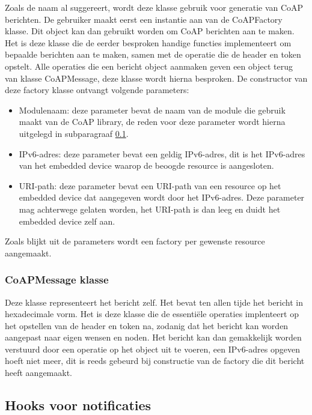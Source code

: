 Zoals de naam al suggereert, wordt deze klasse gebruik voor generatie van CoAP berichten. De gebruiker maakt eerst een instantie aan van de CoAPFactory klasse. Dit object kan dan gebruikt worden om CoAP berichten aan te maken. Het is deze klasse die de eerder besproken handige functies implementeert om bepaalde berichten aan te maken, samen met de operatie die de header en token opstelt. Alle operaties die een bericht object aanmaken geven een object terug van klasse CoAPMessage, deze klasse wordt hierna besproken. De constructor van deze factory klasse ontvangt volgende parameters:
\begin{itemize}
\item Modulenaam: deze parameter bevat de naam van de module die gebruik maakt van de CoAP library, de reden voor deze parameter wordt hierna uitgelegd in subparagraaf \ref{observe_hooks}.
\item IPv6-adres: deze parameter bevat een geldig IPv6-adres, dit is het IPv6-adres van het embedded device waarop de beoogde resource is aangesloten.
\item URI-path: deze parameter bevat een URI-path van een resource op het embedded device dat aangegeven wordt door het IPv6-adres. Deze parameter mag achterwege gelaten worden, het URI-path is dan leeg en duidt het embedded device zelf aan.
\end{itemize}
Zoals blijkt uit de parameters wordt een factory per gewenste resource aangemaakt.

\subsubsection{CoAPMessage klasse}

Deze klasse representeert het bericht zelf. Het bevat ten allen tijde het bericht in hexadecimale vorm. Het is deze klasse die de essenti\"{e}le operaties implenteert op het opstellen van de header en token na, zodanig dat het bericht kan worden aangepast naar eigen wensen en noden. Het bericht kan dan gemakkelijk worden verstuurd door een operatie op het object uit te voeren, een IPv6-adres opgeven hoeft niet meer, dit is reeds gebeurd bij constructie van de factory die dit bericht heeft aangemaakt.

\subsection{Hooks voor notificaties} \label{observe_hooks}


